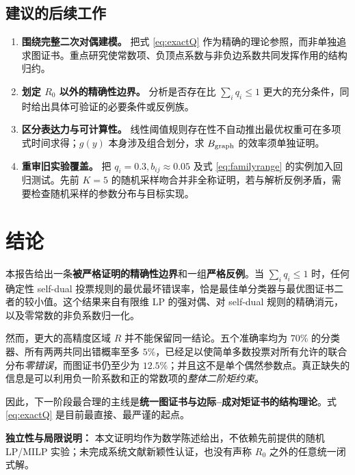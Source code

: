\documentclass[11pt,a4paper]{ctexart}
\theoremstyle{definition}
\begin{document}
\subsection{建议的后续工作}
\begin{enumerate}[leftmargin=2.3em]
\item \textbf{围绕完整二次对偶建模。} 把式 \eqref{eq:exactQ} 作为精确的理论参照，而非单独追求图证书。重点研究使常数项、负顶点系数与非负边系数共同发挥作用的结构归约。
\item \textbf{划定 $R_0$ 以外的精确性边界。} 分析是否存在比 $\sum_iq_i\le1$ 更大的充分条件，同时给出具体可验证的必要条件或反例族。
\item \textbf{区分表达力与可计算性。} 线性阈值规则存在性不自动推出最优权重可在多项式时间求得；$g(y)$ 本身涉及组合划分，求 $B_{\rm graph}$ 的效率须单独证明。
\item \textbf{重审旧实验覆盖。} 把 $q_i=0.3,b_{ij}\approx0.05$ 及式 \eqref{eq:familyrange} 的实例加入回归测试。先前 $K=5$ 的随机采样吻合并非全称证明，若与解析反例矛盾，需要检查随机采样的参数分布与目标实现。
\end{enumerate}

\section{结论}
本报告给出一条\textbf{被严格证明的精确性边界}和一组\textbf{严格反例}。当 $\sum_iq_i\le1$ 时，任何确定性 self-dual 投票规则的最优最坏错误率，恰是最佳单分类器与最优图证书二者的较小值。这个结果来自有限维 LP 的强对偶、对 self-dual 规则的精确消元，以及零常数的非负系数归一化。

然而，更大的高精度区域 $R$ 并不能保留同一结论。五个准确率均为 $70\%$ 的分类器、所有两两共同出错概率至多 $5\%$，已经足以使简单多数投票对所有允许的联合分布\emph{零错误}，而图证书仍至少为 $12.5\%$；并且这不是单个偶然参数点。真正缺失的信息是可以利用负一阶系数和正的常数项的\emph{整体二阶矩约束}。

因此，下一阶段最合理的主线是\textbf{统一图证书与边际--成对矩证书的结构理论}。式 \eqref{eq:exactQ} 是目前最直接、最严谨的起点。

\vspace{0.7em}
\noindent\textbf{独立性与局限说明：} 本文证明均作为数学陈述给出，不依赖先前提供的随机 LP/MILP 实验；未完成系统文献新颖性认证，也没有声称 $R_0$ 之外的任意统一闭式解。\par
\end{document}
